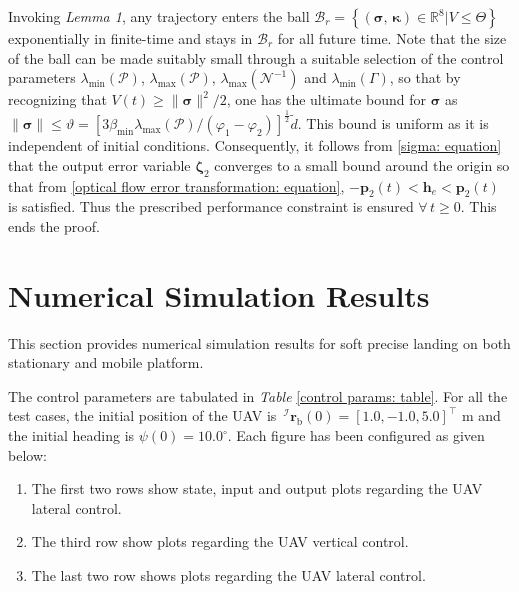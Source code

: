 \documentclass[lettersize,journal]{IEEEtran}
\begin{document}
Invoking \textit{Lemma 1}, any trajectory enters the ball $\mathcal{B}_{r} = \left \{ \left ( \boldsymbol{\sigma}, \, \boldsymbol{\kappa} \right ) \in \mathbb{R}^8 | V \leq \Theta \right\}$ exponentially in finite-time and stays in $\mathcal{B}_{r}$ for all future time. Note that the size of the ball can be made suitably small through a suitable selection of the control parameters $\lambda_{\min}(\mathcal{P})$, $\lambda_{\max}(\mathcal{P})$, $\lambda_{\max}(\mathcal{N}^{-1}) $ and $\lambda_{\min}(\Gamma)$, so that by recognizing that $V(t) \geq \lVert \boldsymbol{\sigma} \rVert^2/2$, one has the ultimate bound for $\boldsymbol{\sigma}$ as $\lVert \boldsymbol{\sigma} \rVert \leq \vartheta = \left[3\beta_{\min}\lambda_{\max}(\mathcal{P})/\left(\varphi_1 - \varphi_2\right)\right]^{\frac{1}{2}}  \tilde{d}$. This bound is uniform as it is independent of initial conditions. 
Consequently, it follows from \eqref{sigma: equation} that the output error variable $\boldsymbol{\zeta}_2$ converges to a small bound around the origin so that from \eqref{optical flow error transformation: equation}, $- \boldsymbol{p}_{2}(t) < \boldsymbol{h}_{e} < \boldsymbol{p}_{2}(t)$ is satisfied. Thus the prescribed performance constraint is ensured $\forall \, t \geq 0$. This ends the proof.

\section{Numerical Simulation Results}
This section provides numerical simulation results for soft precise landing on both stationary and mobile platform.

The control parameters are tabulated in \textit{Table} \ref{control params: table}. For all the test cases, the initial position of the UAV is $\,^\mathcal{I} \boldsymbol{r}_{\text{b}}(0) = [1.0, -1.0, 5.0]^\top$ m and the initial heading is $\psi(0) = 10.0^\circ$.
Each figure has been configured as given below:
\begin{enumerate}
    \item The first two rows show state, input and output plots regarding the UAV lateral control.
    \item The third row show plots regarding the UAV vertical control.
    \item The last two row shows plots regarding the UAV lateral control.
\end{enumerate}
\end{document}

